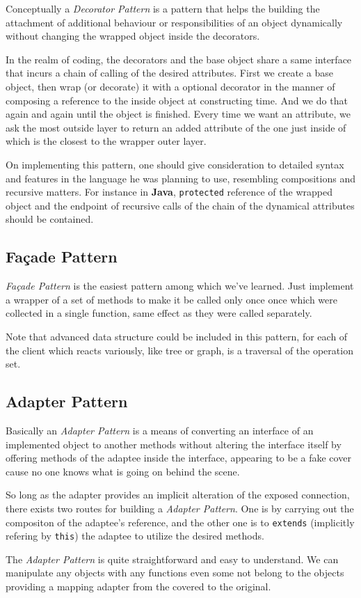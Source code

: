 \documentclass[a4paper]{article}
\begin{document}
Conceptually a \textit{Decorator Pattern} is a pattern that
helps the building the attachment of additional behaviour or
responsibilities of an object dynamically without changing
the wrapped object inside the decorators.

In the realm of coding, the decorators and the base object share
a same interface that incurs a chain of calling of the desired
attributes. First we create a base object, then wrap (or decorate) it
with a optional decorator in the manner of composing a
reference to the inside object at constructing time. And we do that again and again
until the object is finished. Every time we want an attribute,
we ask the most outside layer to return an added attribute of the one just
inside of which is the closest to the wrapper outer layer.

On implementing this pattern, one should give consideration to
detailed syntax and features in the language he was planning
to use, resembling compositions and recursive matters. For instance
in \textbf{Java}, \texttt{protected} reference of the wrapped object
and the endpoint of recursive calls of the chain of the dynamical attributes
should be contained.

\subsection{Façade Pattern}%
\label{sub:facade_pattern}

\textit{Façade Pattern} is the easiest pattern among which we've learned. Just implement
a wrapper of a set of methods to make it be called only once once which were collected in
a single function, same effect as they were called separately.

Note that advanced data structure could be included in this pattern,
for each of the client which reacts variously, like tree or graph, is a
traversal of the operation set.

\subsection{Adapter Pattern}%
\label{sub:adapter_pattern}

Basically an \textit{Adapter Pattern} is a means of converting
an interface of an implemented object to another methods
without altering the interface itself by offering methods
of the adaptee inside the interface, appearing to be a fake cover
cause no one knows what is going on behind the scene.

So long as the adapter provides an implicit alteration of the exposed connection,
there exists two routes for building a \textit{Adapter Pattern}.
One is by carrying out the compositon of the adaptee's reference,
and the other one is to \texttt{extends} (implicitly refering by \texttt{this})
the adaptee to utilize the desired methods.

The \textit{Adapter Pattern} is quite straightforward and easy to understand. We can
manipulate any objects with any functions even some not belong to
the objects providing a mapping adapter from the covered to the original.
\end{document}
